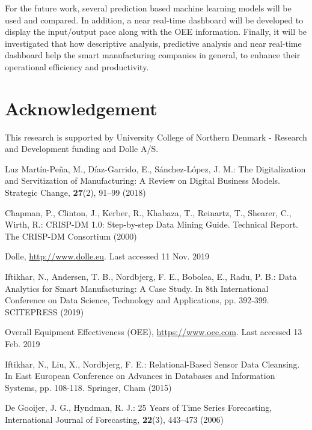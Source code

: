 \documentclass[runningheads]{llncs}
\begin{document}
For the future work, several prediction based machine learning models will be used and compared. In addition, a near real-time dashboard will be developed to display the input/output pace along with the OEE information. Finally, it will be investigated that how descriptive analysis, predictive analysis and near real-time dashboard help the smart manufacturing companies in general, to enhance their operational efficiency and productivity.
\fi

\section{Acknowledgement}
This  research is supported  by University College of Northern Denmark - Research and Development funding and Dolle A/S.

\begin{thebibliography}{8}

Luz Mart\'in-Pe\~na, M., D\'iaz-Garrido, E., S\'anchez-L\'opez, J. M.: The Digitalization and Servitization of Manufacturing: A Review on Digital Business Models. Strategic Change, \textbf{27}(2), 91--99 (2018)

Chapman, P., Clinton, J., Kerber, R., Khabaza, T., Reinartz, T., Shearer, C., Wirth, R.:
CRISP-DM 1.0: Step-by-step Data Mining Guide. Technical Report. The CRISP-DM Consortium (2000)

Dolle, \url{http://www.dolle.eu}. Last accessed 11 Nov. 2019





Iftikhar, N., Andersen, T. B., Nordbjerg, F. E., Bobolea, E., Radu, P. B.: Data Analytics for Smart Manufacturing: A Case Study. In 8th International Conference on Data Science, Technology and Applications, pp. 392-399. SCITEPRESS (2019)


Overall Equipment Effectiveness (OEE), \url{https://www.oee.com}. Last accessed 13 Feb. 2019




Iftikhar, N., Liu, X., Nordbjerg, F. E.: Relational-Based Sensor Data Cleansing. In East European Conference on Advances in Databases and Information Systems, pp. 108-118. Springer, Cham (2015)

 De Gooijer, J. G., Hyndman, R. J.:  25 Years of Time Series Forecasting, International Journal of Forecasting, \textbf{22}(3), 443--473 (2006)


\end{thebibliography}
\end{document}
